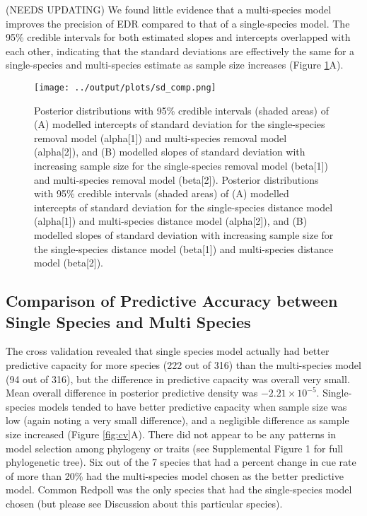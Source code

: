 \documentclass[12pt]{article}
\begin{document}
\par (NEEDS UPDATING) We found little evidence that a multi-species model improves the precision of EDR compared to that of a single-species model.
The 95\% credible intervals for both estimated slopes and intercepts overlapped with each other, indicating that the standard deviations are effectively the same for a single-species and multi-species estimate as sample size increases (Figure \ref{fig:sd}A).

\begin{figure}[h!]
	\texttt{[image: ../output/plots/sd\_comp.png]}
	\caption{Posterior distributions with 95\% credible intervals (shaded areas) of (A) modelled intercepts of standard deviation for the single-species removal model (alpha[1]) and multi-species removal model (alpha[2]), and (B) modelled slopes of standard deviation with increasing sample size for the single-species removal model (beta[1]) and multi-species removal model (beta[2]). Posterior distributions with 95\% credible intervals (shaded areas) of (A) modelled intercepts of standard deviation for the single-species distance model (alpha[1]) and multi-species distance model (alpha[2]), and (B) modelled slopes of standard deviation with increasing sample size for the single-species distance model (beta[1]) and multi-species distance model (beta[2]).}
	\label{fig:sd}
\end{figure}

\subsection{Comparison of Predictive Accuracy between Single Species and Multi Species}

\par The cross validation revealed that single species model actually had better predictive capacity for more species (222 out of 316) than the multi-species model (94 out of 316), but the difference in predictive capacity was overall very small.
Mean overall difference in posterior predictive density was $-2.21 \times 10^{-5}$.
Single-species models tended to have better predictive capacity when sample size was low (again noting a very small difference), and a negligible difference as sample size increased (Figure \ref{fig:cv}A).
There did not appear to be any patterns in model selection among phylogeny or traits (see Supplemental Figure 1 for full phylogenetic tree).
Six out of the 7 species that had a percent change in cue rate of more than 20\% had the multi-species model chosen as the better predictive model.
Common Redpoll was the only species that had the single-species model chosen (but please see Discussion about this particular species).
\end{document}
